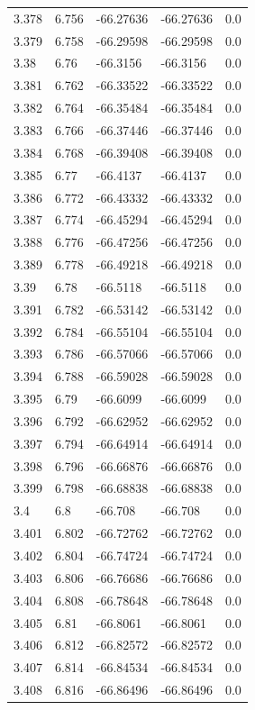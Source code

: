 \begin{tabular}{lllll}
3.378 & 6.756 & -66.27636 & -66.27636 & 0.0 \\
3.379 & 6.758 & -66.29598 & -66.29598 & 0.0 \\
3.38 & 6.76 & -66.3156 & -66.3156 & 0.0 \\
3.381 & 6.762 & -66.33522 & -66.33522 & 0.0 \\
3.382 & 6.764 & -66.35484 & -66.35484 & 0.0 \\
3.383 & 6.766 & -66.37446 & -66.37446 & 0.0 \\
3.384 & 6.768 & -66.39408 & -66.39408 & 0.0 \\
3.385 & 6.77 & -66.4137 & -66.4137 & 0.0 \\
3.386 & 6.772 & -66.43332 & -66.43332 & 0.0 \\
3.387 & 6.774 & -66.45294 & -66.45294 & 0.0 \\
3.388 & 6.776 & -66.47256 & -66.47256 & 0.0 \\
3.389 & 6.778 & -66.49218 & -66.49218 & 0.0 \\
3.39 & 6.78 & -66.5118 & -66.5118 & 0.0 \\
3.391 & 6.782 & -66.53142 & -66.53142 & 0.0 \\
3.392 & 6.784 & -66.55104 & -66.55104 & 0.0 \\
3.393 & 6.786 & -66.57066 & -66.57066 & 0.0 \\
3.394 & 6.788 & -66.59028 & -66.59028 & 0.0 \\
3.395 & 6.79 & -66.6099 & -66.6099 & 0.0 \\
3.396 & 6.792 & -66.62952 & -66.62952 & 0.0 \\
3.397 & 6.794 & -66.64914 & -66.64914 & 0.0 \\
3.398 & 6.796 & -66.66876 & -66.66876 & 0.0 \\
3.399 & 6.798 & -66.68838 & -66.68838 & 0.0 \\
3.4 & 6.8 & -66.708 & -66.708 & 0.0 \\
3.401 & 6.802 & -66.72762 & -66.72762 & 0.0 \\
3.402 & 6.804 & -66.74724 & -66.74724 & 0.0 \\
3.403 & 6.806 & -66.76686 & -66.76686 & 0.0 \\
3.404 & 6.808 & -66.78648 & -66.78648 & 0.0 \\
3.405 & 6.81 & -66.8061 & -66.8061 & 0.0 \\
3.406 & 6.812 & -66.82572 & -66.82572 & 0.0 \\
3.407 & 6.814 & -66.84534 & -66.84534 & 0.0 \\
3.408 & 6.816 & -66.86496 & -66.86496 & 0.0 \\

\end{tabular}
